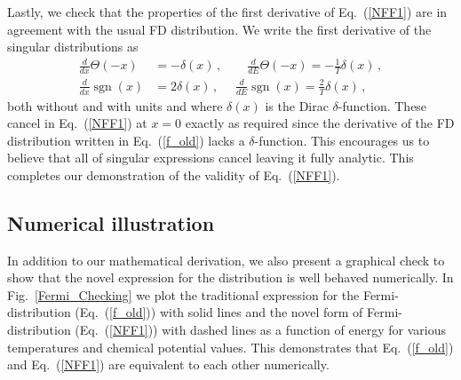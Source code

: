 \documentclass[sn-mathphys,Numbered]{sn-jnl}
\newcommand{\req}[1]{Eq.~(\ref{#1})}
\newcommand{\rf}[1]{Fig.~{\ref{#1}}}
\DeclareMathOperator{\sgn}{sgn}
\begin{document}
Lastly, we check that the properties of the first derivative of \req{NFF1} are in agreement with the usual FD distribution. We write the first derivative of the singular distributions as 
\begin{align}
\label{NFF1b}
\frac{d}{dx}\Theta(-x)&=-\delta(x)\,,\qquad 
\frac{d}{dE}\Theta(-x)=-\frac{1}{T}\delta(x)\,,\\
\frac{d}{dx}\sgn(x)&=2\delta(x)\,,\,\,\quad 
\frac{d}{dE}\sgn(x)=\frac{2}{T}\delta(x)\,,
\end{align}
both without and with units and where $\delta(x)$ is the Dirac $\delta$-function. These cancel in \req{NFF1} at $x=0$ exactly as required since the derivative of the FD distribution written in \req{f_old} lacks a $\delta$-function. This encourages us to believe that all of singular expressions cancel leaving it fully analytic. This completes our demonstration of the validity of \req{NFF1}. 

\subsection{Numerical illustration}
\label{Numerical}
In addition to our mathematical derivation, we also present a graphical check to show that the novel expression for the distribution is well behaved numerically. In \rf{Fermi_Checking} we plot the traditional expression for the Fermi-distribution (\req{f_old}) with solid lines and the novel form of Fermi-distribution (\req{NFF1}) with dashed lines as a function of energy for various temperatures and chemical potential values. This demonstrates that \req{f_old} and \req{NFF1} are equivalent to each other numerically.
\end{document}
